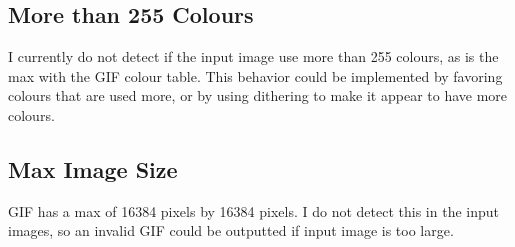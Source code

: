 \documentclass[11pt]{article} %
\begin{document}
\subsection{More than 255 Colours}
I currently do not detect if the input image use more than 255 colours, as is the max with the GIF colour table. This behavior could be implemented by favoring colours that are used more, or by using dithering to make it appear to have more colours.
\subsection{Max Image Size}
GIF has a max of 16384 pixels by 16384 pixels. I do not detect this in the input images, so an invalid GIF could be outputted if input image is too large.

\end{document}
